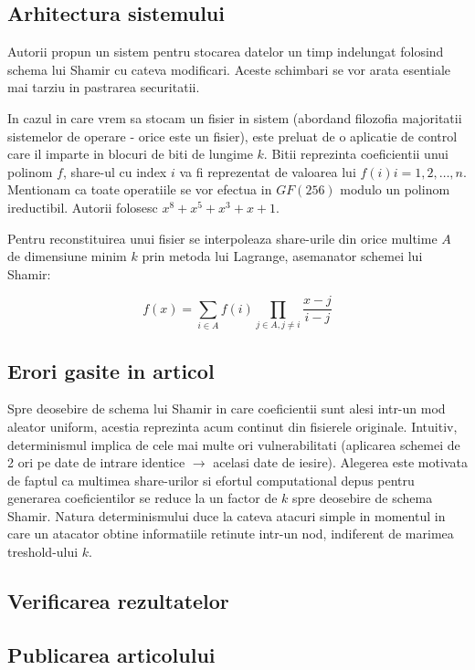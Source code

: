 \documentclass{llncs}
\begin{document}
\label{sec:results}
\subsection{Arhitectura sistemului}

Autorii propun un sistem pentru stocarea datelor un timp indelungat folosind schema lui Shamir cu cateva modificari. Aceste schimbari se vor arata esentiale mai tarziu in pastrarea securitatii.

In cazul in care vrem sa stocam un fisier in sistem (abordand filozofia majoritatii sistemelor de operare - orice este un fisier), este preluat de o aplicatie de control care il imparte in blocuri de biti de lungime $k$. Bitii reprezinta coeficientii unui polinom $f$, share-ul cu index $i$ va fi reprezentat de valoarea lui $f(i) i = 1, 2, \dots, n$. Mentionam ca toate operatiile se vor efectua in $GF(256)$ modulo un polinom ireductibil.
Autorii folosesc $x^8 + x^5 + x^3 + x + 1$.

Pentru reconstituirea unui fisier se interpoleaza share-urile din orice multime $A$ de dimensiune minim $k$ prin metoda lui Lagrange, asemanator schemei lui Shamir:

\begin{equation}
	f(x)=\sum_{i \in A} f(i) \prod_{j \in A, j \neq i} \frac{x-j}{i-j}
\end{equation}

\subsection{Erori gasite in articol}


Spre deosebire de schema lui Shamir in care coeficientii sunt alesi intr-un mod aleator uniform, acestia
reprezinta acum continut din fisierele originale.
Intuitiv, determinismul implica de cele mai multe ori vulnerabilitati (aplicarea schemei de 2 ori pe date de intrare identice $\rightarrow$ acelasi date de iesire).
Alegerea este motivata de faptul ca multimea share-urilor si efortul computational depus pentru generarea coeficientilor se reduce la un factor de $k$ spre deosebire de schema Shamir. Natura determinismului duce la cateva atacuri simple in momentul in care un atacator obtine informatiile retinute intr-un nod, indiferent de marimea treshold-ului $k$.


\subsection{Verificarea rezultatelor}
\subsection{Publicarea articolului}

%
%
%



\end{document}
